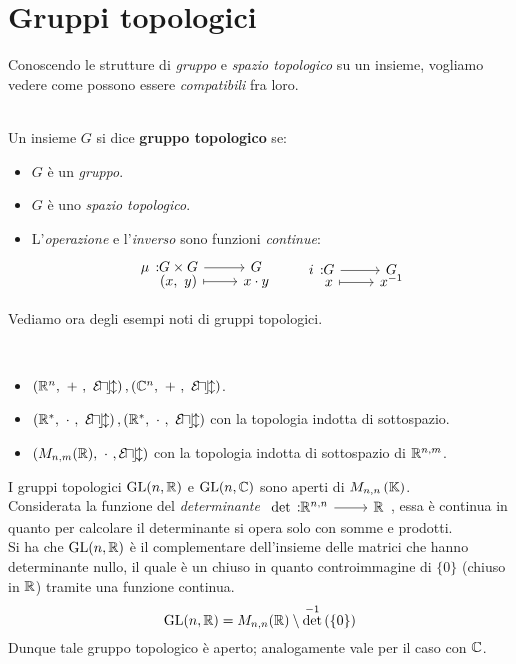 \section{Gruppi topologici}
Conoscendo le strutture di \textit{gruppo} e \textit{spazio topologico} su un insieme, vogliamo vedere come possono essere \textit{compatibili} fra loro.
\begin{define}~{}\\
	Un insieme $G$ si dice \textbf{gruppo topologico} se:
		\begin{itemize}
			\item $G$ è un \textit{gruppo}.
			\item $G$ è uno \textit{spazio topologico}.
			\item L'\textit{operazione} e l'\textit{inverso} sono funzioni \textit{continue}:
			\begin{equation}
				\funztot \mu {G\times G} G {(x,\ y)} {x\cdot y}\qquad \funztot i G G x {x^{-1}}
			\end{equation}
		\end{itemize}
	\vspace{-3mm}
\end{define}
Vediamo ora degli esempi noti di gruppi topologici.
\begin{examples}~{}
	\begin{itemize}
		\item $\left( \mathbb{R}^n, \ +\ , \ \mathcal{E\! u\! c\! l} \right), \left( \mathbb{C} ^n, \ +\ , \ \mathcal{E\! u\! c\! l} \right)$.
		\item $\left( \mathbb{R}^*, \ \cdot\ ,\ \mathcal{E\! u\! c\! l} \right), \left( \mathbb{R}^*, \ \cdot\ , \ \mathcal{E\! u\! c\! l} \right)$ con la topologia indotta di sottospazio.
		\item $\left( M_{n,m}(\mathbb{R}),\ \cdot\ , \mathcal{E\! u\! c\! l} \right)$ con la topologia indotta di sottospazio di $\mathbb{R}^{n,m}$.
	\end{itemize}
\vspace{-3mm}
\end{examples}
\begin{observe}
	I gruppi topologici $\operatorname{GL} (n,\mathbb{R} )$ e $\operatorname{GL} (n, \mathbb{C} )$ sono aperti di $M_{n,n}\left(\mathbb{K}\right)$.\\
	Considerata la funzione del \textit{determinante} $\funz \det {\realset^{n,n}} \realset$, essa è continua in quanto per calcolare il determinante si opera solo con somme e prodotti.\\
	Si ha che $\operatorname{GL}(n, \mathbb{R})$ è il complementare dell'insieme delle matrici che hanno determinante nullo, il quale è un chiuso in quanto controimmagine di $\{0\}$ (chiuso in $\mathbb{R}$) tramite una funzione continua.
	\begin{equation*}
		\operatorname{GL}(n, \mathbb{R})=M_{n,n}(\mathbb{R})\setminus\det^{-1}\left(\left\{0\right\}\right)
	\end{equation*}Dunque tale gruppo topologico è aperto; analogamente vale per il caso con $\mathbb{C}$.
\end{observe}
